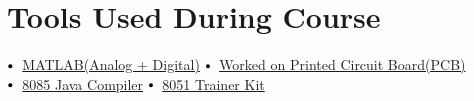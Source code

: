 \documentclass[letterpaper,11pt]{article}
\makeatletter
\newcommand{\resumeItem}[1]{
  \item\small{
    {#1 \vspace{-3pt}}
  }
}
\newcommand{\resumeSubheading}[4]{
  \vspace{-2pt}\item
    \begin{tabular*}{1.0\textwidth}[t]{l@{\extracolsep{\fill}}r}
      \textbf{\large#1} & \textbf{\small #2} \\
      \textit{\large#3} & \textit{\small #4} \\
     
    \end{tabular*}\vspace{-9pt}
}
\newcommand{\resumeSubHeadingListStart}{\begin{itemize}[leftmargin=0.0in, label={}]}
\newcommand{\resumeSubHeadingListEnd}{\end{itemize}}
\newcommand{\resumeItemListStart}{\begin{itemize}}
\newcommand{\resumeItemListEnd}{\end{itemize}\vspace{-5pt}}
\newcommand\sbullet[1][.5]{\mathbin{\vcenter{\hbox{\scalebox{#1}{$\bullet$}}}}}
\makeatother
\begin{document}





\section{Tools Used During Course}


$\sbullet[.75] \hspace{0.1cm}$ {\href{certificateLink.com}{MATLAB(Analog + Digital)}} \hspace{1.6cm}
$\sbullet[.75] \hspace{0.2cm}${\href{certificateLink.com}{Worked on  Printed Circuit Board(PCB)}} \hspace{1.6cm} \\
$\sbullet[.75] \hspace{0.1cm}$ {\href{certificateLink.com}{8085 Java Compiler}} \hspace{2.59cm}
$\sbullet[.75] \hspace{0.2cm}${\href{certificateLink.com} {8051 Trainer Kit}} \hspace{1.6cm} \\
\end{document}
